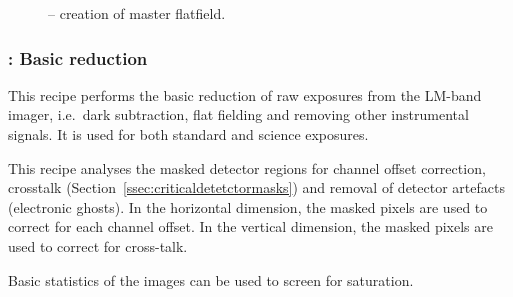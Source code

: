 \begin{figure}[hb]
  \centering
    \def \globalscale {0.700000}
    \fontsize{10}{12}\selectfont
    
  \caption[Recipe: ]{ --
    creation of  master flatfield.}
  \label{fig:metis_lm_img_flat}
\end{figure}

\clearpage
\subsubsection{:  Basic reduction}
\label{lm_img_basic}
\label{rec:lm_img_basic}
\label{sssec:lm_img_basic}
\label{metis_lm_img_basic_reduce}
\label{rec:metis_lm_img_basic_reduce}
\label{sssec:metis_lm_img_basic_reduce}


This recipe performs the basic reduction of raw exposures from the
LM-band imager, i.e.\ dark subtraction, flat fielding and removing
other instrumental signals. It is used for both standard and science exposures.

This recipe analyses the masked detector regions for channel offset correction, crosstalk (Section~\ref{ssec:criticaldetetctormasks}) and removal of detector artefacts (electronic ghosts).
In the horizontal dimension, the masked pixels are used to correct for each channel offset.
In the vertical dimension, the masked pixels are used to correct for cross-talk.

Basic statistics of the images can be used to screen for saturation.

